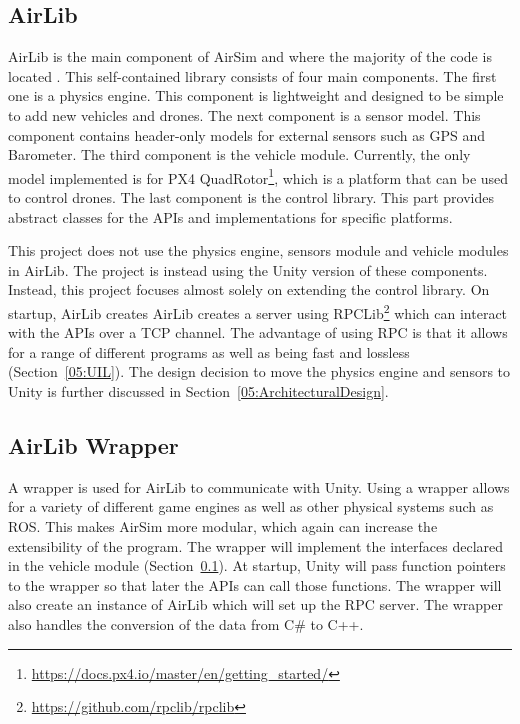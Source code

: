 \subsection{AirLib} \label{05:AirLib}
AirLib is the main component of AirSim and where the majority of the code is located \cite{}. This self-contained library consists of four main components. The first one is a physics engine. This component is lightweight and designed to be simple to add new vehicles and drones. The next component is a sensor model. This component contains header-only models for external sensors such as GPS and Barometer. The third component is the vehicle module. Currently, the only model implemented is for PX4 QuadRotor\footnote{\url{https://docs.px4.io/master/en/getting\_started/}}, which is a platform that can be used to control drones. The last component is the control library. This part provides abstract classes for the APIs and implementations for specific platforms. 

This project does not use the physics engine, sensors module and vehicle modules in AirLib. The project is instead using the Unity version of these components. Instead, this project focuses almost solely on extending the control library. On startup, AirLib creates AirLib creates a server using RPCLib\footnote{\url{https://github.com/rpclib/rpclib}} which can interact with the APIs over a TCP channel. The advantage of using RPC is that it allows for a range of different programs as well as being fast and lossless (Section~\ref{05:UIL}). The design decision to move the physics engine and sensors to Unity is further discussed in Section~\ref{05:ArchitecturalDesign}. 

\subsection{AirLib Wrapper}
A wrapper is used for AirLib to communicate with Unity. Using a wrapper allows for a variety of different game engines as well as other physical systems such as ROS. This makes AirSim more modular, which again can increase the extensibility of the program. The wrapper will implement the interfaces declared in the vehicle module (Section~\ref{05:AirLib}). At startup, Unity will pass function pointers to the wrapper so that later the APIs can call those functions. The wrapper will also create an instance of AirLib which will set up the RPC server. The wrapper also handles the conversion of the data from C\# to C++.

